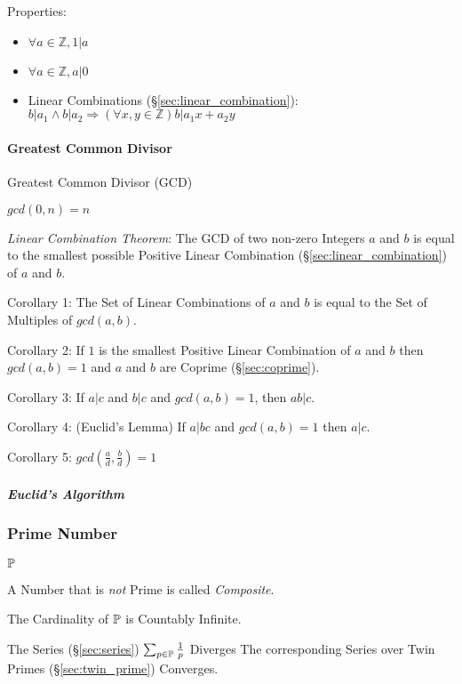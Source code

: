 Properties:

\begin{itemize}
\item $\forall a \in \mathbb{Z}, 1|a$
\item $\forall a \in \mathbb{Z}, a|0$
\item Linear Combinations (\S\ref{sec:linear_combination}): $b|a_1
  \wedge b|a_2 \Rightarrow (\forall x,y \in \mathbb{Z})b|a_1 x + a_2
  y$
\end{itemize}



\paragraph{Greatest Common Divisor}\label{sec:gcd}\hfill

Greatest Common Divisor (GCD)

$gcd(0,n) = n$

\emph{Linear Combination Theorem}: The GCD of two non-zero Integers
$a$ and $b$ is equal to the smallest possible Positive Linear
Combination (\S\ref{sec:linear_combination}) of $a$ and $b$.

Corollary 1: The Set of Linear Combinations of $a$ and $b$ is equal to
the Set of Multiples of $gcd(a,b)$.

Corollary 2: If $1$ is the smallest Positive Linear Combination of $a$
and $b$ then $gcd(a,b) = 1$ and $a$ and $b$ are Coprime
(\S\ref{sec:coprime}).

Corollary 3: If $a|c$ and $b|c$ and $gcd(a,b) = 1$, then $ab|c$.

Corollary 4: (Euclid's Lemma) If $a | bc$ and $gcd(a,b) = 1$ then
$a|c$.

Corollary 5: $gcd(\frac{a}{d}, \frac{b}{d}) = 1$



\subparagraph{Euclid's Algorithm}\label{sec:euclids_algorithm}\hfill



\subsubsection{Prime Number}\label{sec:prime_number}

$\mathbb{P}$

A Number that is \emph{not} Prime is called \emph{Composite}.

The Cardinality of $\mathbb{P}$ is Countably Infinite.

The Series (\S\ref{sec:series}) $\sum_{p \in \mathbb{P}} \frac{1}{p}$
Diverges The corresponding Series over Twin Primes
(\S\ref{sec:twin_prime}) Converges.

